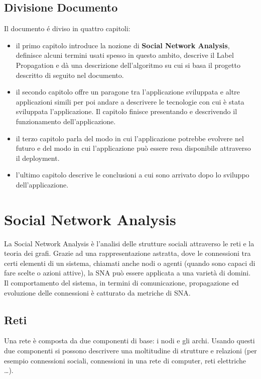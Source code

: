 \documentclass[a4paper,12pt]{report}
\begin{document}
\section{Divisione Documento}
Il documento é diviso in quattro capitoli:
\begin{itemize}
\item il primo capitolo introduce la nozione di \textbf{Social Network Analysis}, definisce alcuni termini usati spesso in questo ambito, descrive il Label Propagation e dà una descrizione dell'algoritmo su cui si basa il progetto descritto di seguito nel documento.

\item il secondo capitolo offre un paragone tra l'applicazione sviluppata e altre applicazioni simili per poi andare a descrivere le tecnologie con cui è stata sviluppata l'applicazione. Il capitolo finisce presentando e descrivendo il funzionamento dell'applicazione.

\item il terzo capitolo parla del modo in cui l'applicazione potrebbe evolvere nel futuro e del modo in cui l'applicazione può essere resa disponibile attraverso il deployment.

\item l'ultimo capitolo descrive le conclusioni a cui sono arrivato dopo lo sviluppo dell'applicazione.

\end{itemize}
%

\chapter{Social Network Analysis}
	La Social Network Analysis è l'analisi delle strutture sociali attraverso le reti e la teoria dei grafi. \cite{snaintro}
	Grazie ad una rappresentazione astratta, dove le connessioni tra certi elementi di un sistema, chiamati anche nodi o agenti (quando sono capaci di fare scelte o azioni attive), la SNA può essere applicata a una varietà di domini. Il comportamento del sistema, in termini di comunicazione, propagazione ed evoluzione delle connessioni è catturato da metriche di SNA. \cite{avpra}

	\section{Reti}
	Una rete è composta da due componenti di base: i nodi e gli archi. Usando questi due componenti si possono descrivere una moltitudine di strutture e relazioni (per esempio connessioni sociali, connessioni in una rete di computer, reti elettriche \dots). 
\end{document}
